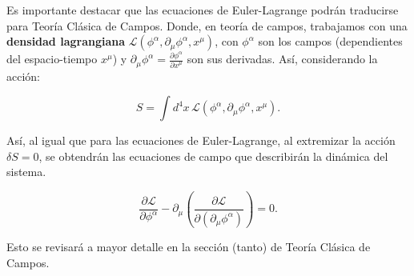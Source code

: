 \documentclass[../main.tex]{subfiles}
\begin{document}
Es importante destacar que las ecuaciones de Euler-Lagrange podrán traducirse para Teoría Clásica de Campos. Donde, en teoría de campos, trabajamos con una \textbf{densidad lagrangiana} $\mathcal{L}(\phi^\alpha, \partial_\mu \phi^\alpha, x^\mu)$, con $\phi^\alpha$ son los campos (dependientes del espacio-tiempo $x^\mu$) y $\partial_\mu \phi^\alpha = \frac{\partial \phi^\alpha}{\partial x^\mu}$ son sus derivadas. Así, considerando la acción: 

\begin{equation}
    S = \int d^4x \, \mathcal{L}(\phi^\alpha, \partial_\mu \phi^\alpha, x^\mu) \label{accion-campos}.
\end{equation}

Así, al igual que para las ecuaciones de Euler-Lagrange, al extremizar la acción $\delta S = 0$, se obtendrán las ecuaciones de campo que describirán la dinámica del sistema. 

\begin{equation}
    \frac{\partial \mathcal{L}}{\partial \phi^\alpha} - \partial_\mu \left( \frac{\partial \mathcal{L}}{\partial (\partial_\mu \phi^\alpha)} \right) = 0.
\end{equation}

Esto se revisará a mayor detalle en la sección (tanto) de Teoría Clásica de Campos. 
\end{document}
